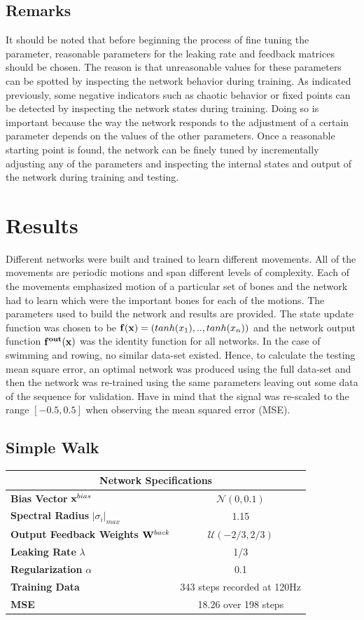 \documentclass[letterpaper,9pt]{article}
\newcommand{\networkSpecs}[7]{
  \begin{center}
  \begin{tabular}{ | l | c | }
    \hline
    \multicolumn{2}{|c|}{{\bf Network Specifications}} \\
    \hline
    {\bf Bias Vector} ${\bf x}^{bias}$ & $\mathcal{N}(#1)$ \\
    \hline
    {\bf Spectral Radius} $|\sigma_i|_{max}$ & #2 \\
    \hline
    {\bf Output Feedback Weights} ${\bf W}^{back}$ & $\mathcal{U}(#3)$ \\
    \hline
    {\bf Leaking Rate} $\lambda$ & #4 \\
    \hline
    {\bf Regularization} $\alpha$ & #5\\
    \hline
    {\bf Training Data} & #6\\
    \hline
    {\bf MSE} & #7\\
    \hline
  \end{tabular}    
  \end{center}
}
\begin{document}
\subsection{Remarks}

It should be noted that before beginning the process of fine tuning the parameter, reasonable parameters for the leaking rate and feedback matrices should be chosen. The reason is that unreasonable values for these parameters can be spotted by inspecting the network behavior during training. As indicated previously, some negative indicators such as chaotic behavior or fixed points can be detected by inspecting the network states during training. Doing so is important because the way the network responds to the adjustment of a certain parameter depends on the values of the other parameters. Once a reasonable starting point is found, the network can be finely tuned by incrementally adjusting any of the parameters and inspecting the internal states and output of the network during training and testing.

\section{Results}

Different networks were built and trained to learn different movements. All of the movements are periodic motions and span different levels of complexity. Each of the movements emphasized motion of a particular set of bones and the network had to learn which were the important bones for each of the motions. The parameters used to build the network and results are provided. The state update function was chosen to be ${\bf f(x)}=(tanh(x_1),..,tanh(x_n))$ and the network output function ${\bf f^{out}(x)}$ was the identity function for all networks. In the case of swimming and rowing, no similar data-set existed. Hence, to calculate the testing mean square error, an optimal network was produced using the full data-set and then the network was re-trained using the same parameters leaving out some data of the sequence for validation. Have in mind that the signal was re-scaled to the range $[-0.5,0.5]$ when observing the mean squared error (MSE).

\subsection{Simple Walk}

\networkSpecs{0,0.1}
             {1.15}
             {-2/3,2/3}
             {1/3}
             {0.1}
             {343 steps recorded at 120Hz}
             {18.26 over 198 steps}
\end{document}
